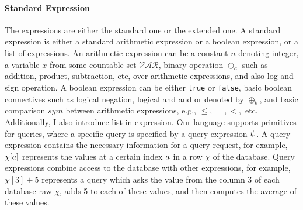 \paragraph{Standard Expression}
The expressions are either the standard one or the extended one.
A standard expression is
either a standard arithmetic expression or a boolean expression, or a list of expressions.
An arithmetic expression can be a constant $n$ denoting integer, a variable $x$ from some countable set $\mathcal{VAR}$, binary operation $\oplus_a$ such as addition, product, subtraction, etc, over arithmetic expressions, and also log and sign operation. 
%
A boolean expression can be either {\tt true} or {\tt false}, basic boolean connectives such as logical negation, logical and and or denoted by $\oplus_b$, and basic comparison $sym$ between arithmetic expressions, e.g., $\leq,=,<,$ etc.
Additionally, I also introduce list in expression.
Our language supports primitives for queries, 
where a specific query is specified by a query expression $\psi$. 
A query expression contains the necessary information for a query request, for example, 
$\chi[a]$ represents the values at a certain index $a$ in a row $\chi$ of the database. 
Query expressions combine access to the database with other expressions, 
for example, $\chi[3] + 5$ represents a query which asks the value from the column 3 of each database raw $\chi$, adds 5 to each of these values, 
and then computes the average of these values.
